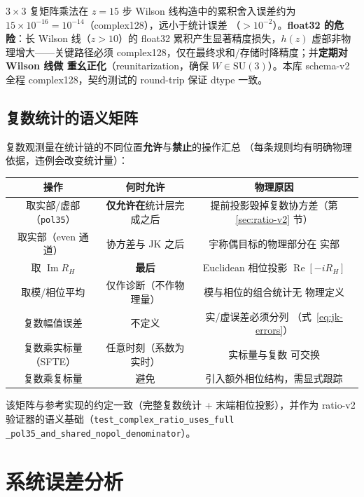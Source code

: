 \documentclass[11pt,a4paper]{ctexart}
\newcommand{\code}[1]{\texttt{#1}}
\begin{document}
$3\times3$ 复矩阵乘法在 $z=15$ 步 Wilson 线构造中的累积舍入误差约为
$15\times10^{-16}=10^{-14}$（complex128），远小于统计误差
（$>10^{-2}$）。\textbf{float32 的危险}：长 Wilson 线（$z>10$）的
float32 累积产生显著精度损失，$h(z)$ 虚部非物理增大——关键路径必须
complex128，仅在最终求和/存储时降精度；并\textbf{定期对 Wilson 线做
重幺正化}（reunitarization，确保 $W\in\mathrm{SU}(3)$）。本库
schema-v2 全程 complex128，契约测试的 round-trip 保证 dtype 一致。

\subsection{复数统计的语义矩阵}

复数观测量在统计链的不同位置\textbf{允许}与\textbf{禁止}的操作汇总
（每条规则均有明确物理依据，违例会改变统计量）：

\begin{center}
\small
\begin{tabular}{c c c}
\toprule
\textbf{操作} & \textbf{何时允许} & \textbf{物理原因} \\
\midrule
取实部/虚部（\code{pol35}） & \textbf{仅允许在}统计层完成之后 &
提前投影毁掉复数协方差（第 \ref{sec:ratio-v2} 节） \\
取实部（even 通道） & 协方差与 JK 之后 & 宇称偶目标的物理部分在
实部 \\
取 $\operatorname{Im}R_H$ & \textbf{最后} & Euclidean 相位投影
$\operatorname{Re}[-iR_H]$ \\
取模/相位平均 & 仅作诊断（不作物理量） & 模与相位的组合统计无
物理定义 \\
复数幅值误差 & 不定义 & 实/虚误差必须分列
（式~\eqref{eq:jk-errors}） \\
复数乘实标量（SFTE） & 任意时刻（系数为实时） & 实标量与复数
可交换 \\
复数乘复标量 & 避免 & 引入额外相位结构，需显式跟踪 \\
\bottomrule
\end{tabular}
\end{center}
该矩阵与参考实现的约定一致（完整复数统计 + 末端相位投影），并作为
ratio-v2 验证器的语义基础（\code{test\_complex\_ratio\_uses\_full
\_pol35\_and\_shared\_nopol\_denominator}）。

\section{系统误差分析}
\label{sec:systematics}
\end{document}
